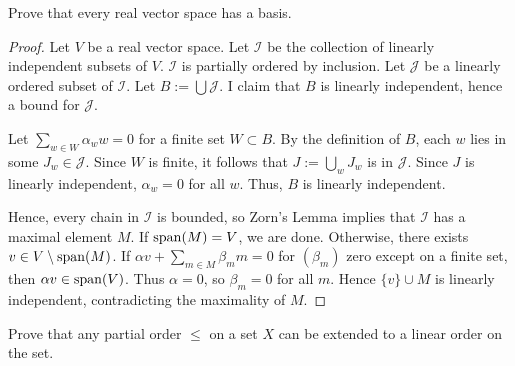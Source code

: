 \documentclass{article}
\begin{document}
 Prove that every real vector space has a basis.
\begin{proof}
Let $V$ be a real vector space. Let $\mathcal I$ be the collection of linearly independent subsets of $V$.  $\mathcal I$ is partially ordered by inclusion.  Let $\mathcal J$ be a linearly ordered subset of $\mathcal I$. Let $B := \bigcup \mathcal J$.  I claim that $B$ is linearly independent, hence a bound for $\mathcal J$.

Let $\sum_{w \in W} \alpha_w w = 0$ for a finite set $W \subset B$.  By the definition of $B$, each $w$ lies in some $J_w \in \mathcal J$.  Since $W$ is finite, it follows that $J:= \bigcup_w J_w$ is in $\mathcal J$. Since $J$ is linearly independent, $\alpha_w = 0$ for all $w$.  Thus, $B$ is linearly independent.

Hence, every chain in $\mathcal I$ is bounded, so Zorn's Lemma implies that $\mathcal I$ has a maximal element $M$.  If $\operatorname{span}(M) = V$, we are done. Otherwise, there exists $v \in V \setminus \operatorname{span}(M)$.  If $\alpha v + \sum_{m \in M} \beta_m m = 0$ for $(\beta_m)$ zero except on a finite set, then $\alpha v \in \operatorname{span}(V)$. Thus $\alpha = 0$, so  $\beta_m = 0$ for all $m$. Hence $\{v\} \cup M$ is linearly independent, contradicting the maximality of $M$.
\end{proof}

 Prove that any partial order $\le$ on a set $X$ can be extended to a linear order on the set.
\end{document}
